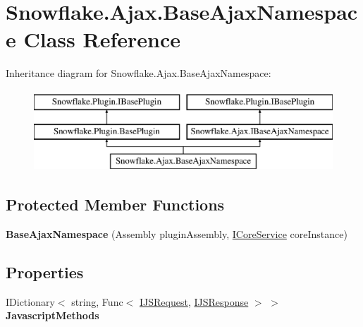 \hypertarget{class_snowflake_1_1_ajax_1_1_base_ajax_namespace}{}\section{Snowflake.\+Ajax.\+Base\+Ajax\+Namespace Class Reference}
\label{class_snowflake_1_1_ajax_1_1_base_ajax_namespace}


 


Inheritance diagram for Snowflake.\+Ajax.\+Base\+Ajax\+Namespace\+:\begin{figure}[H]
\begin{center}
\leavevmode
\includegraphics[height=3.000000cm]{class_snowflake_1_1_ajax_1_1_base_ajax_namespace}
\end{center}
\end{figure}
\subsection*{Protected Member Functions}
\begin{DoxyCompactItemize}
\item 
\hypertarget{class_snowflake_1_1_ajax_1_1_base_ajax_namespace_ac0f9fc3b53968a79a37ea929f91a2e12}{}{\bfseries Base\+Ajax\+Namespace} (Assembly plugin\+Assembly, \hyperlink{interface_snowflake_1_1_service_1_1_i_core_service}{I\+Core\+Service} core\+Instance)\label{class_snowflake_1_1_ajax_1_1_base_ajax_namespace_ac0f9fc3b53968a79a37ea929f91a2e12}

\end{DoxyCompactItemize}
\subsection*{Properties}
\begin{DoxyCompactItemize}
\item 
\hypertarget{class_snowflake_1_1_ajax_1_1_base_ajax_namespace_a3dfb53386b78f7433eba3c944cffba85}{}I\+Dictionary$<$ string, Func$<$ \hyperlink{interface_snowflake_1_1_ajax_1_1_i_j_s_request}{I\+J\+S\+Request}, \hyperlink{interface_snowflake_1_1_ajax_1_1_i_j_s_response}{I\+J\+S\+Response} $>$ $>$ {\bfseries Javascript\+Methods}\label{class_snowflake_1_1_ajax_1_1_base_ajax_namespace_a3dfb53386b78f7433eba3c944cffba85}

\end{DoxyCompactItemize}
